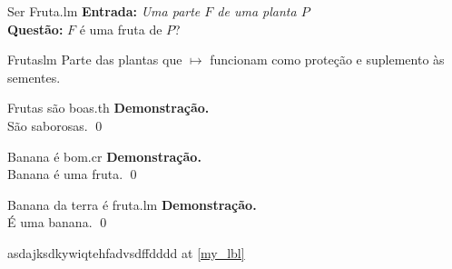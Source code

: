 \newpage
\begin{problem}{Ser Fruta.}{lm} \textbf{Entrada:}  \textit{Uma parte $F$ de uma planta $P$} \\ \textbf{Questão:} $F$ é uma fruta de $P$?  \end{problem}
\begin{define}{Frutas}{lm}  
  Parte das plantas que
  $\mapsto$
  funcionam como proteção e suplemento às sementes. \end{define}
\begin{theorem}{Frutas são boas.}{th} \textbf{Demonstração.}\\ São saborosas. \qed \end{theorem}
\begin{coro}{Banana é bom.}{cr} \textbf{Demonstração.}\\ Banana é uma fruta. \qed \end{coro}
\begin{lemma}{Banana da terra é fruta.}{lm} \textbf{Demonstração.}\\ É uma banana. \qed \end{lemma}

\begin{Shaded}
\begin{Highlighting}[]
 \OtherTok{\{}
\CommentTok{  }\OtherTok{=}\OtherTok{;}
\CommentTok{  }\CommentTok{ }\OtherTok{[}\OtherTok{=}\CommentTok{  }\OtherTok{];}
\CommentTok{  }\CommentTok{ }\OtherTok{[}\OtherTok{=}\CommentTok{ }\OtherTok{=}\CommentTok{ }\OtherTok{=}\CommentTok{ }\OtherTok{=}\OtherTok{];}
\CommentTok{  }\OtherTok{[}\OtherTok{=}\OtherTok{];}
\CommentTok{  }\CommentTok{ }\OtherTok{->}\CommentTok{ }\SpecialCharTok{\textbackslash{}\textbackslash{}}\OtherTok{;}
\CommentTok{    }\CommentTok{ -- }\OtherTok{;}
\OtherTok{\}}
\end{Highlighting}
\end{Shaded}


asdajksdkywiqtehfadvsdffdddd at \ref{my_lbl}

